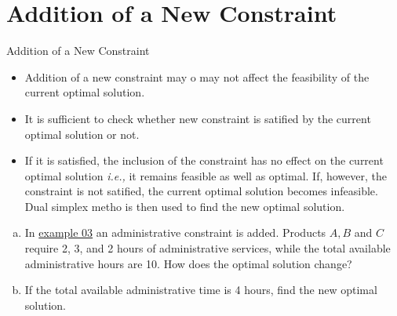 
\section{Addition of a New Constraint}
\label{sec:addition-new-constraint}

\begin{frame}{Addition of a New Constraint}
  \begin{itemize} \justifying \parskip4mm
  \item Addition of a new constraint may o may not affect the feasibility of the current optimal solution.
  \item It is sufficient to check whether new constraint is satified by the current optimal solution or not.
  \item If it is satisfied, the inclusion of the constraint has no effect on the current optimal solution \emph{i.e.,} it remains feasible as well as optimal. If, however, the constraint is not satified, the current \alert{optimal solution becomes infeasible. Dual simplex metho is then used to find the new optimal solution.}
  \end{itemize}
\end{frame}

\begin{frameExample}{}{}
  
  \begin{enumerate}[a)] \justifying \parskip4mm
  \item In \hyperlink{example03}{example 03} an administrative constraint is added. Products $A, B$ and $C$ require 2, 3, and 2 hours of administrative services, while the total available administrative hours are 10. How does the optimal solution change?
  \item \label{example08} If the total available administrative time is 4 hours, find the new optimal solution.
  \end{enumerate}
\end{frameExample}

